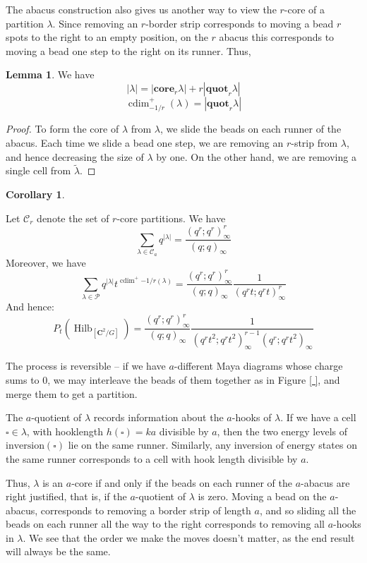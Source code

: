 \documentclass{amsart}[12pt]
\theoremstyle{definition}
\newtheorem{lemma}[dummy]{Lemma}
\newtheorem{corollary}[dummy]{Corollary}
\newcommand{\C}{\mathbf{C}}
\newcommand{\core}{\mathbf{core}}
\newcommand{\quot}{\mathbf{quot}}
\DeclareMathOperator{\Hilb}{Hilb}
\DeclareMathOperator{\cdim}{cdim}
\begin{document}
The abacus construction also gives us another way to view the $r$-core of a partition $\lambda$.  Since removing an $r$-border strip corresponds to moving a bead $r$ spots to the right to an empty position, on the $r$ abacus this corresponds to moving a bead one step to the right on its runner.  Thus, 


\begin{lemma}
We have
$$|\lambda|=|\core_r{\lambda}|+r|\quot_r{\lambda}|$$
$$\cdim^+_{-1/r}(\lambda)=|\quot_r{\lambda}|$$
\end{lemma}

\begin{proof}
To form the core of $\lambda$ from $\lambda$, we slide the beads on each runner of the abacus.  Each time we slide a bead one step, we are removing an $r$-strip from $\lambda$, and hence decreasing the size of $\lambda$ by one.  On the other hand, we are removing a single cell from $\tilde{\lambda}$.


\end{proof}


\begin{corollary} \label{cor:product-formulas-traditional-cores}

Let $\mathcal{C}_r$ denote the set of $r$-core partitions.  We have
$$\sum_{\lambda\in\mathcal{C}_a} q^{|\lambda|}=\frac{(q^r;q^r)_\infty^r}{(q;q)_\infty}$$
Moreover, we have 
$$\sum_{\lambda\in\mathcal{P}} q^{|\lambda|} t^{\cdim^+{-1/r}(\lambda)}=\frac{(q^r;q^r)_\infty^r}{(q;q)_\infty}\frac{1}{(q^rt;q^rt)_\infty^r}$$
And hence:
$$P_t(\Hilb_{[\C^2/G]})=\frac{(q^r;q^r)_\infty^r}{(q;q)_\infty}\frac{1}{(q^rt^2;q^rt^2)_\infty^{r-1}(q^r;q^rt^2)_\infty}$$
\end{corollary}





The process is reversible -- if we have $a$-different Maya diagrams whose charge sums to $0$, we may interleave the beads of them together as in Figure \ref{ }, and merge them to get a partition.  


The $a$-quotient of $\lambda$ records information about the $a$-hooks of $\lambda$.  If we have a cell $\square\in\lambda$,  with hooklength $h(\square)=ka$ divisible by $a$, then the two energy levels of $\textrm{inversion}(\square)$ lie on the same runner.  Similarly, any inversion of energy states on the same runner corresponds to a cell with hook length divisible by $a$.  

Thus, $\lambda$ is an $a$-core if and only if the beads on each runner of the $a$-abacus are right justified, that is, if the $a$-quotient of $\lambda$ is zero.  Moving a bead on the $a$-abacus, corresponds to removing a border strip of length $a$, and so sliding all the beads on each runner all the way to the right corresponds to removing all $a$-hooks in $\lambda$.  We see that the order we make the moves doesn't matter, as the end result will always be the same.
\end{document}
